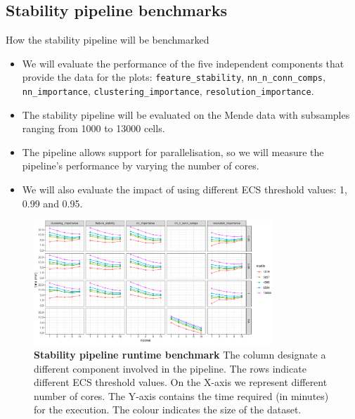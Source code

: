\subsection{Stability pipeline benchmarks}

\begin{frame}{How the stability pipeline will be benchmarked}
    \begin{itemize}[<+->]
        \item We will evaluate the performance of the five independent components that provide the data for the plots: \texttt{feature\_stability}, \texttt{nn\_n\_conn\_comps}, \texttt{nn\_importance}, \texttt{clustering\_importance}, \texttt{resolution\_importance}.
        \item The stability pipeline will be evaluated on the Mende data \cite{Mende2022} with subsamples ranging from 1000 to 13000 cells.
        \item The pipeline allows support for parallelisation, so we will measure the pipeline's performance by varying the number of cores.
        \item We will also evaluate the impact of using different ECS threshold values: 1, 0.99 and 0.95.
    \end{itemize}
\end{frame}

\begin{frame}
    \begin{figure}
                \includegraphics[width=0.8\textwidth]{images/ch4/4_pipeline.png}
                \caption{\justifying \textbf{Stability pipeline runtime benchmark} The column designate a different component involved in the pipeline. The rows indicate different ECS threshold values. On the X-axis we represent different number of cores. The Y-axis contains the time required (in minutes) for the execution. The colour indicates the size of the dataset.} %
            \end{figure}
\end{frame}